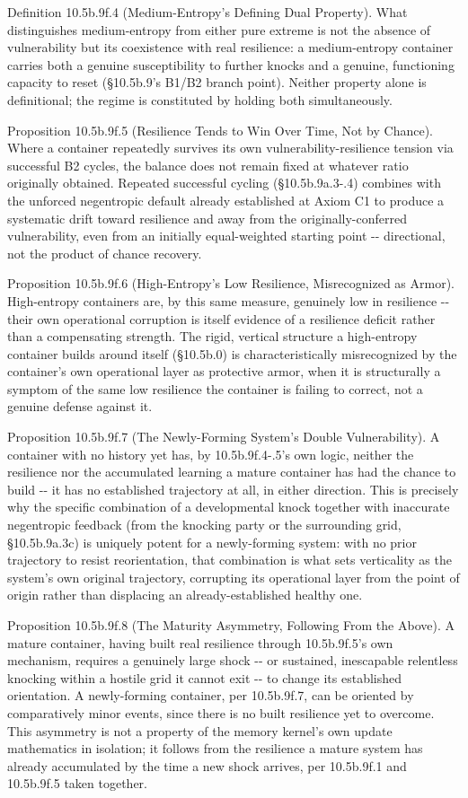 \documentclass[
]{article}
\begin{document}
Definition 10.5b.9f.4 (Medium-Entropy's Defining Dual Property). What
distinguishes medium-entropy from either pure extreme is not the absence
of vulnerability but its coexistence with real resilience: a
medium-entropy container carries both a genuine susceptibility to
further knocks and a genuine, functioning capacity to reset (§10.5b.9's
B1/B2 branch point). Neither property alone is definitional; the regime
is constituted by holding both simultaneously.

Proposition 10.5b.9f.5 (Resilience Tends to Win Over Time, Not by
Chance). Where a container repeatedly survives its own
vulnerability-resilience tension via successful B2 cycles, the balance
does not remain fixed at whatever ratio originally obtained. Repeated
successful cycling (§10.5b.9a.3-.4) combines with the unforced
negentropic default already established at Axiom C1 to produce a
systematic drift toward resilience and away from the
originally-conferred vulnerability, even from an initially
equal-weighted starting point -\/- directional, not the product of
chance recovery.

Proposition 10.5b.9f.6 (High-Entropy's Low Resilience, Misrecognized as
Armor). High-entropy containers are, by this same measure, genuinely low
in resilience -\/- their own operational corruption is itself evidence
of a resilience deficit rather than a compensating strength. The rigid,
vertical structure a high-entropy container builds around itself
(§10.5b.0) is characteristically misrecognized by the container's own
operational layer as protective armor, when it is structurally a symptom
of the same low resilience the container is failing to correct, not a
genuine defense against it.

Proposition 10.5b.9f.7 (The Newly-Forming System's Double
Vulnerability). A container with no history yet has, by 10.5b.9f.4-.5's
own logic, neither the resilience nor the accumulated learning a mature
container has had the chance to build -\/- it has no established
trajectory at all, in either direction. This is precisely why the
specific combination of a developmental knock together with inaccurate
negentropic feedback (from the knocking party or the surrounding grid,
§10.5b.9a.3c) is uniquely potent for a newly-forming system: with no
prior trajectory to resist reorientation, that combination is what sets
verticality as the system's own original trajectory, corrupting its
operational layer from the point of origin rather than displacing an
already-established healthy one.

Proposition 10.5b.9f.8 (The Maturity Asymmetry, Following From the
Above). A mature container, having built real resilience through
10.5b.9f.5's own mechanism, requires a genuinely large shock -\/- or
sustained, inescapable relentless knocking within a hostile grid it
cannot exit -\/- to change its established orientation. A newly-forming
container, per 10.5b.9f.7, can be oriented by comparatively minor
events, since there is no built resilience yet to overcome. This
asymmetry is not a property of the memory kernel's own update
mathematics in isolation; it follows from the resilience a mature system
has already accumulated by the time a new shock arrives, per 10.5b.9f.1
and 10.5b.9f.5 taken together.
\end{document}

